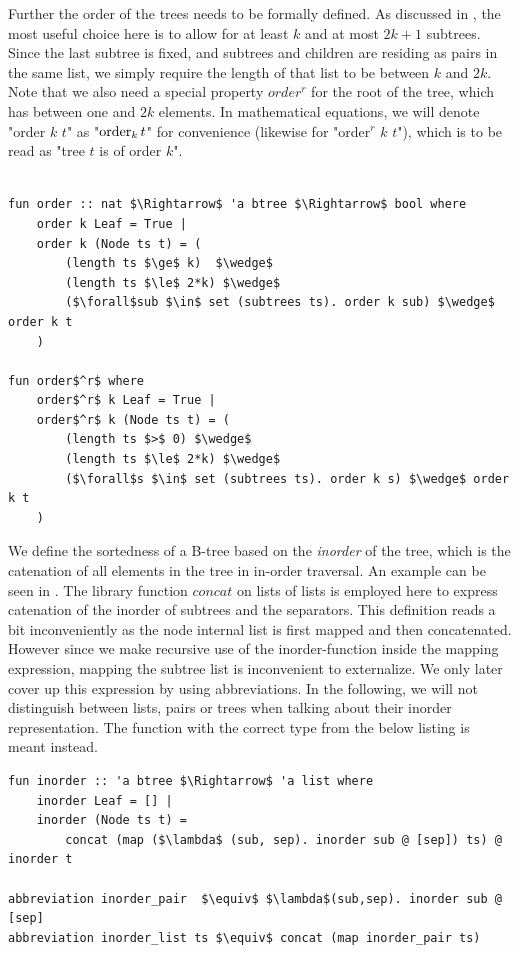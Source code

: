 Further the order of the trees needs to be formally defined.
As discussed in , the most useful choice here is
to allow for at least $k$ and at most $2k+1$ subtrees.
Since the last subtree is fixed, and subtrees and children are residing as pairs in the same list,
we simply require the length of that list to be between $k$ and $2k$.
Note that we also need a special property $order^r$ for the root of the tree,
which has between one and $2k$ elements.
In mathematical equations, we will denote "order $k$ $t$" as "$\operatorname{order}_k t$"
for convenience (likewise for "order$^r$ $k$ $t$"), which is to be read as
"tree $t$ is of order $k$".

\begin{lstlisting}[mathescape=true, language=Isabelle]

fun order :: nat $\Rightarrow$ 'a btree $\Rightarrow$ bool where
    order k Leaf = True |
    order k (Node ts t) = (
        (length ts $\ge$ k)  $\wedge$
        (length ts $\le$ 2*k) $\wedge$
        ($\forall$sub $\in$ set (subtrees ts). order k sub) $\wedge$ order k t
    )

fun order$^r$ where
    order$^r$ k Leaf = True |
    order$^r$ k (Node ts t) = (
        (length ts $>$ 0) $\wedge$
        (length ts $\le$ 2*k) $\wedge$
        ($\forall$s $\in$ set (subtrees ts). order k s) $\wedge$ order k t
    )

\end{lstlisting}

We define the sortedness of a B-tree based on the \textit{inorder} of the tree,
which is the catenation of all elements in the tree in in-order traversal.
An example can be seen in .
The library function $concat$ on lists of lists
is employed here to express catenation of
the inorder of subtrees and the separators.
This definition reads a bit inconveniently
as the node internal list is first mapped and then concatenated.
However since we make recursive use of the inorder-function
inside the mapping expression, mapping the subtree list is inconvenient to externalize.
We only later cover up this expression by using abbreviations.
In the following, we will not distinguish between lists, 
pairs or trees when talking about their inorder representation.
The function with the correct type from the below listing is meant instead.

\begin{lstlisting}[mathescape=true, language=Isabelle]
fun inorder :: 'a btree $\Rightarrow$ 'a list where
    inorder Leaf = [] |
    inorder (Node ts t) = 
        concat (map ($\lambda$ (sub, sep). inorder sub @ [sep]) ts) @ inorder t

abbreviation inorder_pair  $\equiv$ $\lambda$(sub,sep). inorder sub @ [sep]
abbreviation inorder_list ts $\equiv$ concat (map inorder_pair ts)
\end{lstlisting}

